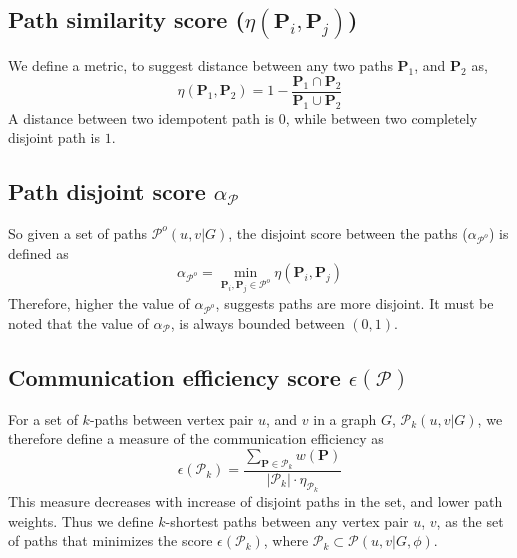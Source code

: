 \documentclass{article}
\begin{document}
\subsection{Path similarity score ($\eta(\mathbf{P}_i, \mathbf{P}_j)$) }\label{sec:pathsim}
We define a metric, to suggest distance between any two paths $\mathbf{P}_{1}$, and $\mathbf{P}_2$ as, 
\begin{equation*}
    \eta(\mathbf{P}_1, \mathbf{P}_2) = 1 - \dfrac{\mathbf{P}_1\cap\mathbf{P}_2}{\mathbf{P}_1\cup\mathbf{P}_2}
\end{equation*}
A distance between two idempotent path is $0$, while between two completely disjoint path is $1$. 

\subsection{Path disjoint score $\alpha_{\mathcal{P}}$}\label{sec:disjscore}
So given a set of paths $\mathcal{P}^{o}(u,v \vert G)$, the disjoint score between the paths ($\alpha_{\mathcal{P}^{o}}$) is defined as 
\begin{equation*}
    \alpha_{\mathcal{P}^{o}} = \min_{\mathbf{P}_i, \mathbf{P}_j \in \mathcal{P}^{o}} \eta(\mathbf{P}_i, \mathbf{P}_j)
\end{equation*}
Therefore, higher the value of $\alpha_{\mathcal{P}^o}$, suggests paths are more disjoint. It must be noted that the value of $\alpha_{\mathcal{P}}$, is always bounded between $(0, 1)$. 

\subsection{Communication efficiency score $\epsilon(\mathcal{P})$}\label{sec:eff}
For a set of $k$-paths between vertex pair $u$, and $v$ in a graph $G$, $\mathcal{P}_{k}(u,v\vert G)$, we therefore define a measure of the communication efficiency as 
\begin{equation*}
  \epsilon( \mathcal{P}_{k} ) = \dfrac{\sum_{\mathbf{P}\in \mathcal{P}_k} w(\mathbf{P}) }{ \vert\mathcal{P}_k\vert \cdot \eta_{\mathcal{P}_{k}}}    
\end{equation*}
This measure decreases with increase of disjoint paths in the set, and lower path weights. Thus we define $k$-shortest paths between any vertex pair $u$, $v$, as the set of paths that minimizes the score $\epsilon(\mathcal{P}_k)$, where $\mathcal{P}_k \subset \mathcal{P}(u,v\vert G,\phi)$. 
\end{document}
